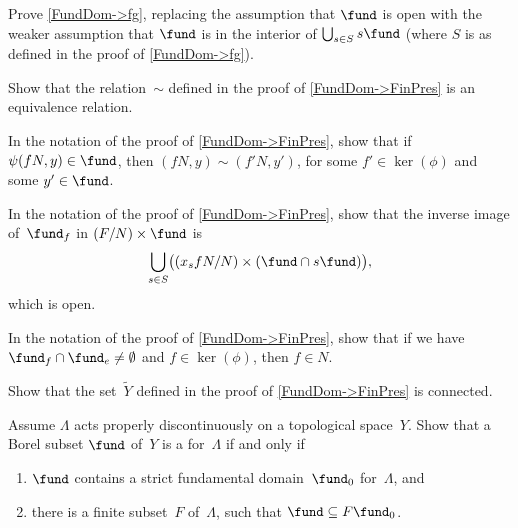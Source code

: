 \begin{exercises}
\item \label{FundDomNotOpen->fg}
 Prove \cref{FundDom->fg}, replacing the assumption
that $\fund$ is open with the weaker assumption that
$\fund$ is in the interior of $\bigcup_{s \in S} s \fund$
(where $S$ is as defined in the proof of
\cref{FundDom->fg}).

\item \label{EquivRelnOnFxY}
 Show that the relation~$\sim$ defined in the proof of
\cref{FundDom->FinPres} is an equivalence relation.

\item \label{FinPresInvImg}
 In the notation of the proof of
\cref{FundDom->FinPres}, show that if $\psi(fN,y) \in
\fund$, then $(fN,y) \sim (f'N,y')$, for some $f' \in
\ker(\phi)$ and some $y' \in \fund$.

\item \label{FinPresOpenSet}
 In the notation of the proof of
\cref{FundDom->FinPres},  show that the inverse image
of~$\fund_f$ in $(F/N) \times \fund$ is
 $$ \bigcup_{s \in S} \bigl( (x_s fN/N ) \times (\fund
\cap s\fund) \bigr) ,$$
 which is open.

\item \label{FinPresPancakes}
 In the notation of the proof of
\cref{FundDom->FinPres}, show that if we have $\fund_f \cap
\fund_e \neq \emptyset$ and $f \in \ker(\phi)$, then $f
\in N$.

\item \label{FinPresYConn}
 Show that the set~$\widetilde{Y}$ defined in the proof of
\cref{FundDom->FinPres} is connected.

\item \label{CoarseFundIff}
Assume $\Lambda$ acts properly discontinuously on a
topological space~$Y$.
Show that a Borel subset $\fund$ of~$Y$ is a  for~$\Lambda$ if and only if
 \begin{enumerate}
 \item $\fund$ contains a strict fundamental domain~$\fund_0$ for~$\Lambda$,
 and
 \item there is a finite subset~$F$ of~$\Lambda$, such that $\fund \subseteq F \fund_0$.
 \end{enumerate}

\end{exercises}







